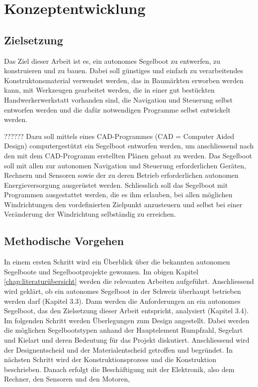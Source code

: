 
\chapter{Konzeptentwicklung }
\label{chap:konzeptentwicklung}
\section{Zielsetzung}
Das Ziel dieser Arbeit ist es, ein autonomes Segelboot zu entwerfen, zu konstruieren und zu bauen. Dabei soll günstiges und einfach zu verarbeitendes Konstruktonsmaterial verwendet werden, das in Baumärkten erworben werden kann, mit Werkzeugen gearbeitet werden, die in einer gut bestückten Handwerkerwerkstatt vorhanden sind, die Navigation und Steuerung selbst entworfen werden und die dafür notwendigen Programme selbst entwickelt werden. 

?????? Dazu soll mittels eines CAD-Programmes (CAD = Computer Aided Design) computergestützt ein Segelboot entworfen werden, um anschliessend nach den mit dem CAD-Programm erstellten Plänen gebaut zu werden. Das Segelboot soll mit allen zur autonomen Navigation und Steuerung erforderlichen Geräten, Rechnern und Sensoren sowie der zu deren Betrieb erforderlichen autonomen Energieversorgung ausgerüstet werden. Schliesslich soll das Segelboot mit Programmen ausgestattet werden, die es ihm erlauben, bei allen möglichen Windrichtungen den vordefinierten Zielpunkt anzusteuern und selbst bei einer Veränderung der Windrichtung selbständig zu erreichen.

\section{Methodische Vorgehen}

In einem ersten Schritt wird ein Überblick über die bekannten autonomen Segelboote und Segelbootprojekte gewonnen. Im obigen Kapitel \ref{chap:literaturübersicht} werden die relevanten Arbeiten aufgeführt. Anschliessend wird geklärt, ob ein autonomes Segelboot in der Schweiz überhaupt betrieben werden darf (Kapitel 3.3). Dann werden die Anforderungen an ein autonomes Segelboot, das den Zielsetzung dieser Arbeit entspricht, analysiert (Kapitel 3.4). Im folgenden Schritt werden Überlegungen zum Design angestellt. Dabei werden die möglichen Segelbootstypen anhand der Hauptelement Rumpfzahl, Segelart und Kielart und deren Bedeutung für das Projekt diskutiert. Anschliessend wird der Designentscheid und der Materialentscheid getroffen und begründet. In nächsten Schritt wird der Konstruktionsprozess und die Konstruktion beschrieben. Danach erfolgt die Beschäftigung mit der Elektronik, also dem Rechner, den Sensoren und den Motoren,  



